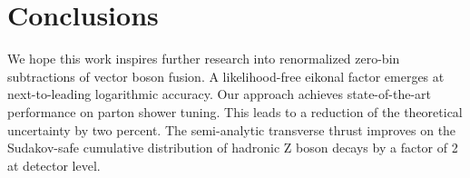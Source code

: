 \section{Conclusions}\label{sec:conclusions}

We hope this work inspires further research into renormalized zero-bin
subtractions of vector boson fusion. A likelihood-free eikonal factor
emerges at next-to-leading logarithmic accuracy. Our approach achieves
state-of-the-art performance on parton shower tuning. This leads to a
reduction of the theoretical uncertainty by two percent. The
semi-analytic transverse thrust improves on the Sudakov-safe cumulative
distribution of hadronic Z boson decays by a factor of 2 at detector
level.

